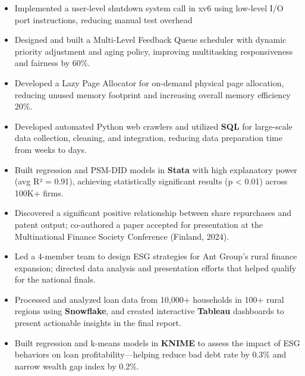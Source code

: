 \documentclass{resume}
\begin{document}
\begin{itemize}
  \item Implemented a user-level shutdown system call in xv6 using low-level I/O port instructions, reducing manual test overhead
  \item Designed and built a Multi-Level Feedback Queue scheduler with dynamic priority adjustment and aging policy, improving multitasking responsiveness and fairness by 60\%.
  \item Developed a Lazy Page Allocator for on-demand physical page allocation, reducing unused memory footprint and increasing overall memory efficiency 20\%.
\end{itemize}

\begin{itemize}
  \item Developed automated Python web crawlers and utilized \textbf{SQL} for large-scale data collection, cleaning, and integration, reducing data preparation time from weeks to days.
  \item Built regression and PSM-DID models in \textbf{Stata} with high explanatory power (avg R² = 0.91), achieving statistically significant results (p < 0.01) across 100K+ firms.
  \item Discovered a significant positive relationship between share repurchases and patent output; co-authored a paper accepted for presentation at the Multinational Finance Society Conference (Finland, 2024).
\end{itemize}

\begin{itemize}
  \item Led a 4-member team to design ESG strategies for Ant Group's rural finance expansion; directed data analysis and presentation efforts that helped qualify for the national finals.
  \item Processed and analyzed loan data from 10,000+ households in 100+ rural regions using \textbf{Snowflake}, and created interactive \textbf{Tableau} dashboards to present actionable insights in the final report.
  \item Built regression and k-means models in \textbf{KNIME} to assess the impact of ESG behaviors on loan profitability—helping reduce bad debt rate by 0.3\% and narrow wealth gap index by 0.2\%.
\end{itemize}
\end{document}
